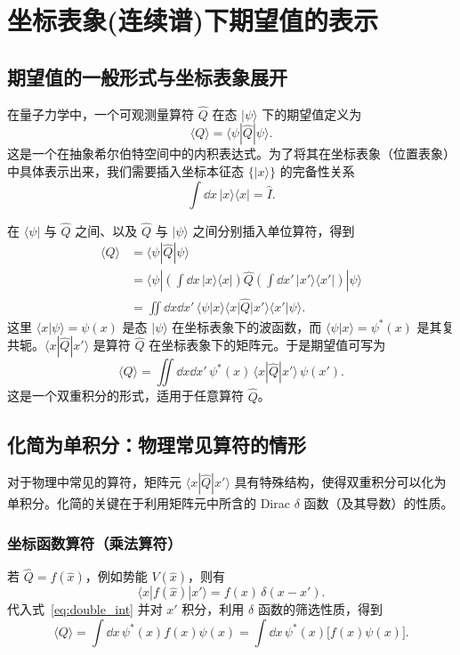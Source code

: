 \section{坐标表象(连续谱)下期望值的表示}
\subsection{期望值的一般形式与坐标表象展开}
在量子力学中，一个可观测量算符 $\hat{Q}$ 在态 $|\psi\rangle$ 下的期望值定义为
\[
\langle Q \rangle = \langle \psi | \hat{Q} | \psi \rangle .
\]
这是一个在抽象希尔伯特空间中的内积表达式。为了将其在坐标表象（位置表象）中具体表示出来，我们需要插入坐标本征态 $\{|x\rangle\}$ 的完备性关系
\[
\int \dd x \, |x\rangle\langle x| = \hat{I}.
\]

在 $\langle \psi |$ 与 $\hat{Q}$ 之间、以及 $\hat{Q}$ 与 $|\psi\rangle$ 之间分别插入单位算符，得到
\begin{align}
	\langle Q \rangle &= \langle \psi | \hat{Q} | \psi \rangle \nonumber \\
	&= \langle \psi | \left( \int \dd x \, |x\rangle\langle x| \right) \hat{Q} \left( \int \dd x' \, |x'\rangle\langle x'| \right) |\psi \rangle \nonumber \\
	&= \iint \dd x \dd x' \, \langle \psi | x \rangle \langle x | \hat{Q} | x' \rangle \langle x' | \psi \rangle .
	\label{eq:double_int}
\end{align}
这里 $\langle x | \psi \rangle = \psi(x)$ 是态 $|\psi\rangle$ 在坐标表象下的波函数，而 $\langle \psi | x \rangle = \psi^*(x)$ 是其复共轭。$\langle x | \hat{Q} | x' \rangle$ 是算符 $\hat{Q}$ 在坐标表象下的矩阵元。于是期望值可写为
\[
\langle Q \rangle = \iint \dd x \dd x' \, \psi^*(x) \, \langle x | \hat{Q} | x' \rangle \, \psi(x').
\]
这是一个双重积分的形式，适用于任意算符 $\hat{Q}$。

\subsection{化简为单积分：物理常见算符的情形}
对于物理中常见的算符，矩阵元 $\langle x | \hat{Q} | x' \rangle$ 具有特殊结构，使得双重积分可以化为单积分。化简的关键在于利用矩阵元中所含的 Dirac $\delta$ 函数（及其导数）的性质。

\subsubsection{坐标函数算符（乘法算符）}
若 $\hat{Q} = f(\hat{x})$，例如势能 $V(\hat{x})$，则有
\[
\langle x | f(\hat{x}) | x' \rangle = f(x) \, \delta(x - x').
\]
代入式~\eqref{eq:double_int} 并对 $x'$ 积分，利用 $\delta$ 函数的筛选性质，得到
\[
\langle Q \rangle = \int \dd x \, \psi^*(x) f(x) \psi(x) = \int \dd x \, \psi^*(x) \bigl[ f(x) \psi(x) \bigr].
\]

